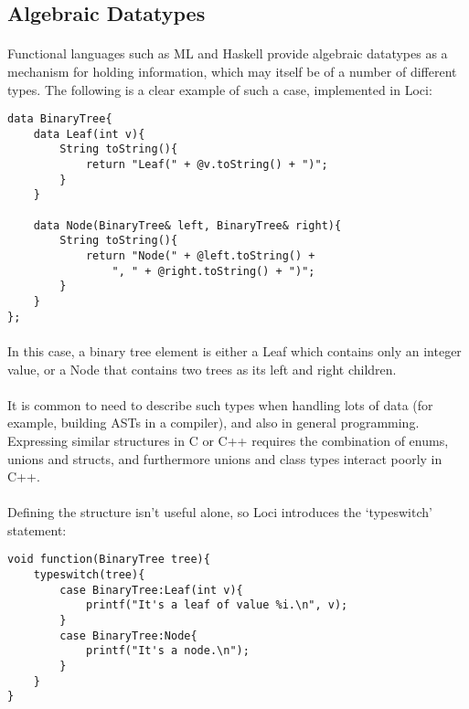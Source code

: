 \documentclass[12pt,twoside,notitlepage]{report}
\begin{document}
\subsection{Algebraic Datatypes}

\paragraph{}
Functional languages such as ML and Haskell provide algebraic datatypes as a mechanism for holding information, which may itself be of a number of different types. The following is a clear example of such a case, implemented in Loci:

\small{
\begin{verbatim}
data BinaryTree{
    data Leaf(int v){
        String toString(){
            return "Leaf(" + @v.toString() + ")";
        }
    }
    
    data Node(BinaryTree& left, BinaryTree& right){
        String toString(){
            return "Node(" + @left.toString() +
                ", " + @right.toString() + ")";
        }
    }
};
\end{verbatim}
}

\paragraph{}
In this case, a binary tree element is either a Leaf which contains only an integer value, or a Node that contains two trees as its left and right children.

\paragraph{}
It is common to need to describe such types when handling lots of data (for example, building ASTs in a compiler), and also in general programming. Expressing similar structures in C or C++ requires the combination of enums, unions and structs, and furthermore unions and class types interact poorly in C++.

\paragraph{}
Defining the structure isn't useful alone, so Loci introduces the `typeswitch' statement:

\small{
\begin{verbatim}
void function(BinaryTree tree){
    typeswitch(tree){
        case BinaryTree:Leaf(int v){
            printf("It's a leaf of value %i.\n", v);
        }
        case BinaryTree:Node{
            printf("It's a node.\n");
        }
    }
}
\end{verbatim}
}
\end{document}
